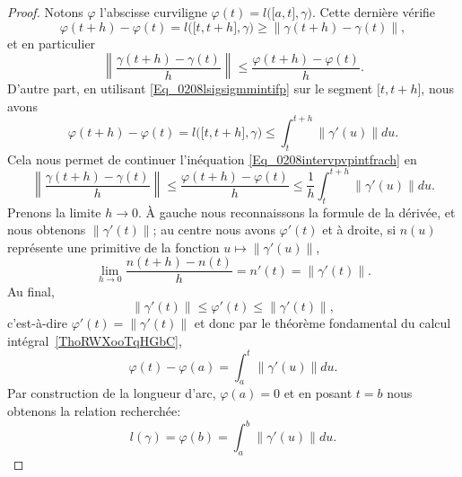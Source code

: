 \begin{proof}
	Notons \( \varphi\) l'abscisse curviligne \( \varphi(t)=l\big( \mathopen[ a , t \mathclose],\gamma \big)\). Cette dernière vérifie
	\begin{equation}
		\varphi(t+h)-\varphi(t)=l\big( \mathopen[ t , t+h \mathclose],\gamma \big)\geq \| \gamma(t+h)-\gamma(t) \|,
	\end{equation}
	et en particulier
	\begin{equation}     \label{Eq_0208intervpvpintfrach}
		\left\| \frac{ \gamma(t+h)-\gamma(t) }{ h } \right\|\leq \frac{ \varphi(t+h)-\varphi(t) }{ h }.
	\end{equation}
	D'autre part, en utilisant \eqref{Eq_0208lsigsigmmintifp} sur le segment \( \mathopen[ t , t+h \mathclose]\), nous avons
	\begin{equation}
		\varphi(t+h)-\varphi(t)=l\big( \mathopen[ t , t+h \mathclose],\gamma \big)\leq\int_{t}^{t+h}\| \gamma'(u) \|du.
	\end{equation}
	Cela nous permet de continuer l'inéquation \eqref{Eq_0208intervpvpintfrach} en
	\begin{equation}
		\left\| \frac{ \gamma(t+h)-\gamma(t) }{ h } \right\|\leq\frac{ \varphi(t+h)-\varphi(t) }{ h }\leq\frac{1}{ h }\int_t^{t+h}\| \gamma'(u) \|du.
	\end{equation}
	Prenons la limite \( h\to 0\). À gauche nous reconnaissons la formule de la dérivée, et nous obtenons \( \| \gamma'(t) \|\); au centre nous avons \( \varphi'(t)\) et à droite, si \( n(u)\) représente une primitive de la fonction \( u\mapsto\| \gamma'(u) \|\),
	\begin{equation}
		\lim_{h\to 0}\frac{ n(t+h)-n(t) }{ h }=n'(t)=\| \gamma'(t) \|.
	\end{equation}
	Au final,
	\begin{equation}
		\| \gamma'(t) \|\leq \varphi'(t)\leq\| \gamma'(t) \|,
	\end{equation}
	c'est-à-dire \( \varphi'(t)=\| \gamma'(t) \|\) et donc par le théorème fondamental du calcul intégral~\ref{ThoRWXooTqHGbC},
	\begin{equation}
		\varphi(t)-\varphi(a)=\int_a^t\| \gamma'(u) \|du.
	\end{equation}
	Par construction de la longueur d'arc, \( \varphi(a)=0\) et en posant \( t=b\) nous obtenons la relation recherchée:
	\begin{equation}
		l(\gamma)=\varphi(b)=\int_a^b\| \gamma'(u) \|du.
	\end{equation}
\end{proof}

